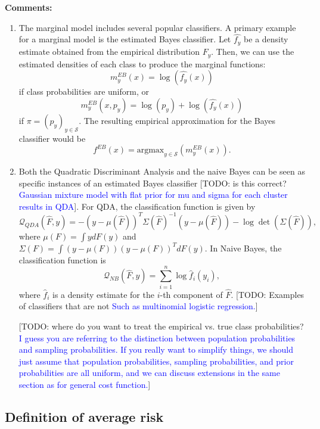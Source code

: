 \documentclass[12pt]{article}
\begin{document}
\textbf{Comments:}
\begin{enumerate}
\item The marginal model includes several popular classifiers.
A primary example for a marginal model is the estimated Bayes classifier. Let $\hat{f_y}$ be a density estimate obtained from the empirical distribution $\hat{F_y}$. Then,
we can use the estimated densities of each class to produce the marginal functions:
\[ m^{EB}_y(x) = \log(\hat{f_{y}}(x))\]
if class probabilities are uniform, or 
\[m^{EB}_y(x,p_y) = \log(p_y) + \log(\hat{f_y}(x))\]
if $\pi = (p_y)_{y \in \mathcal{S}}$.
The resulting empirical approximation for the Bayes classifier
would be 
\[ f^{EB}(x) = \text{argmax}_{y \in \mathcal{S}}(m^{EB}_y(x)).\]
\item Both the Quadratic Discriminant Analysis and the naive Bayes can be seen as specific instances of an estimated Bayes classifier [TODO: is this correct? \textcolor{blue}{Gaussian mixture model with flat prior for mu and sigma for each cluster results in QDA}]. 
 For QDA, the classification function is
given by
\[
\mathcal{Q}_{QDA}(\hat{F}, y) = -(y - \mu(\hat{F}))^T \Sigma(\hat{F})^{-1} (y-\mu(\hat{F})) - \log\det(\Sigma(\hat{F})),
\]
where $\mu(F) = \int y dF(y)$ and $\Sigma(F) = \int (y-\mu(F))(y-\mu(F))^T dF(y)$.
In Naive Bayes, the classification function is
\[
\mathcal{Q}_{NB}(\hat{F},  y) = \sum_{i=1}^n \log \hat{f}_i(y_i),
\]
where $\hat{f}_i$ is a density estimate for the $i$-th component of
$\hat{F}$.
[TODO: Examples of classifiers that are not \textcolor{blue}{Such as multinomial logistic regression.}]
\item[] [TODO: where do you want to treat the empirical vs. true class probabilities? \textcolor{blue}{I guess you are referring to the distinction between population probabilities and sampling probabilities.  If you really want to simplify things, we should just assume that population probabilities, sampling probabilities, and prior probabilities are all uniform, and we can discuss extensions in the same section as for general cost function.}]
\end{enumerate}

\subsection{Definition of average risk}\label{sec:average_risk}
\end{document}
